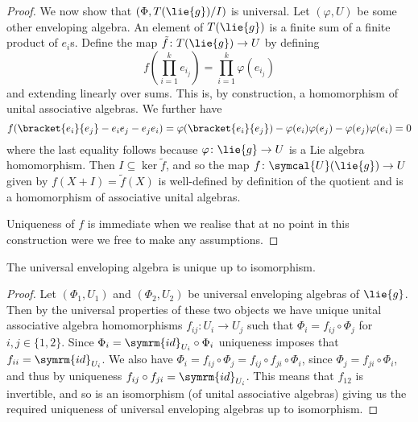 \documentclass[fleqn]{NotesClass}
\newcommand{\id}{\symrm{id}}
\newcommand{\universalenveloping}{\symcal{U}}
\begin{document}
\begin{lma}{}{}
\begin{proof}
            We now show that \((\Phi, T(\lie{g})/I)\) is universal.
            Let \((\varphi, U)\) be some other enveloping algebra.
            An element of \(T(\lie{g})\) is a finite sum of a finite product of \(e_i\)s.
            Define the map \(\tilde{f} \colon T(\lie{g}) \to U\) by defining
            \begin{equation}
                f\left( {\textstyle \prod_{i=1}^k e_{i_j} }\right) = {\textstyle \prod_{i=1}^k} \varphi(e_{i_j})
            \end{equation}
            and extending linearly over sums.
            This is, by construction, a homomorphism of unital associative algebras.
            We further have
            \begin{equation}
                f(\bracket{e_i}{e_j} - e_ie_j - e_je_i) = \varphi(\bracket{e_i}{e_j}) - \varphi(e_i)\varphi(e_j) - \varphi(e_j)\varphi(e_i) = 0
            \end{equation}
            where the last equality follows because \(\varphi \colon \lie{g} \to U\) is a Lie algebra homomorphism.
            Then \(I \subseteq \ker \tilde{f}\), and so the map \(f \colon \universalenveloping(\lie{g}) \to U\) given by \(f(X + I) = \tilde{f}(X)\) is well-defined by definition of the quotient and is a homomorphism of associative unital algebras.
            
            Uniqueness of \(f\) is immediate when we realise that at no point in this construction were we free to make any assumptions.
        \end{proof}
    \end{lma}
    
    
    \begin{lma}{}{}
        The universal enveloping algebra is unique up to isomorphism.
        \begin{proof}
            Let \((\Phi_1, U_1)\) and \((\Phi_2, U_2)\) be universal enveloping algebras of \(\lie{g}\).
            Then by the universal properties of these two objects we have unique unital associative algebra homomorphisms \(f_{ij} \colon U_i \to U_j\) such that \(\Phi_i = f_{ij} \circ \Phi_j\) for \(i, j \in \{1, 2\}\).
            Since \(\Phi_i = \id_{U_i} \circ \Phi_i\) uniqueness imposes that \(f_{ii} = \id_{U_i}\).
            We also have \(\Phi_i = f_{ij} \circ \Phi_j = f_{ij} \circ f_{ji} \circ \Phi_i\), since \(\Phi_j = f_{ji} \circ \Phi_i\), and thus by uniqueness \(f_{ij} \circ f_{ji} = \id_{U_i}\).
            This means that \(f_{12}\) is invertible, and so is an isomorphism (of unital associative algebras) giving us the required uniqueness of universal enveloping algebras up to isomorphism.
        \end{proof}
    \end{lma}
    
\end{document}
